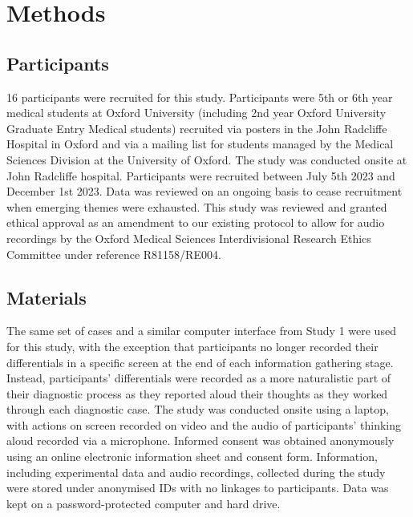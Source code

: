 \documentclass[a4paper, nobind]{templates/ociamthesis}
\begin{document}
\section*{Methods}\label{methods-1}

\subsection*{Participants}\label{participants-1}

16 participants were recruited for this study. Participants were 5th or 6th year medical students at Oxford University (including 2nd year Oxford University Graduate Entry Medical students) recruited via posters in the John Radcliffe Hospital in Oxford and via a mailing list for students managed by the Medical Sciences Division at the University of Oxford. The study was conducted onsite at John Radcliffe hospital. Participants were recruited between July 5th 2023 and December 1st 2023. Data was reviewed on an ongoing basis to cease recruitment when emerging themes were exhausted. This study was reviewed and granted ethical approval as an amendment to our existing protocol to allow for audio recordings by the Oxford Medical Sciences Interdivisional Research Ethics Committee under reference R81158/RE004.

\subsection*{Materials}\label{materials-1}

The same set of cases and a similar computer interface from Study 1 were used for this study, with the exception that participants no longer recorded their differentials in a specific screen at the end of each information gathering stage. Instead, participants' differentials were recorded as a more naturalistic part of their diagnostic process as they reported aloud their thoughts as they worked through each diagnostic case. The study was conducted onsite using a laptop, with actions on screen recorded on video and the audio of participants' thinking aloud recorded via a microphone. Informed consent was obtained anonymously using an online electronic information sheet and consent form. Information, including experimental data and audio recordings, collected during the study were stored under anonymised IDs with no linkages to participants. Data was kept on a password-protected computer and hard drive.
\end{document}
